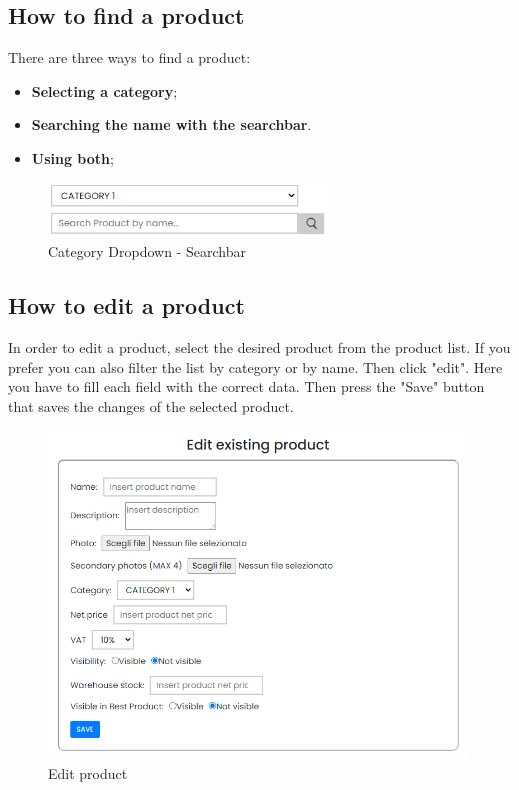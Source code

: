 \subsection{How to find a product}\label{_findProduct}
There are three ways to find a product:
\begin{itemize} 
    \item \textbf{Selecting a category};
    \item \textbf{Searching the name with the searchbar}. 
    \item \textbf{Using both};
\end{itemize}

\begin{figure}[H]
    \centering
    \includegraphics[width=20em]{res/images/venditore/categoryandsearchbar.png}
    \caption{Category Dropdown - Searchbar}
\end{figure}

\subsection{How to edit a product}\label{_editProduct}
In order to edit a product, select the desired product from the product list. If you prefer you can also filter the list by category or by name. Then click "edit".
Here you have to fill each field with the correct data. Then press the "Save" button that saves the changes of the selected product.
\begin{figure}[H]
    \centering
    \includegraphics[width=30em]{res/images/venditore/editproduct.png}
    \caption{Edit product}
\end{figure}


